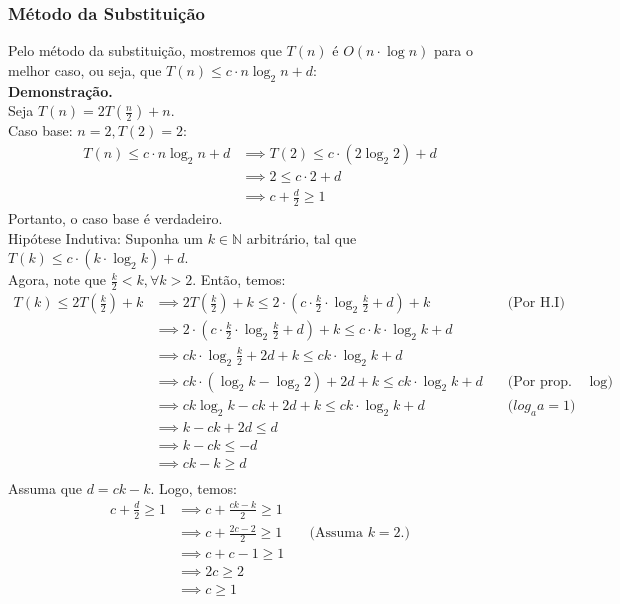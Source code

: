 \subsubsection{Método da Substituição}

Pelo método da substituição, mostremos que $T(n)$ é $O(n \cdot \log n)$ para o melhor caso, ou seja, que $T(n) \le c \cdot n \log_2 n + d$: \\
\textbf{Demonstração.} \\
Seja $T(n) = 2T(\frac{n}{2}) + n$. \\
Caso base: $n = 2, T(2) = 2$:
\begin{align*} 
  T(n) \le c \cdot n \log_2 n + d & \implies T(2) \le c \cdot (2 \log_2 2) + d \\ 
  &\implies 2 \le c \cdot 2 + d\\ 
  &\implies c + \frac{d}{2} \ge 1 
\end{align*}
Portanto, o caso base é verdadeiro. \\
Hipótese Indutiva: Suponha um $k \in \mathbb{N}$ arbitrário, tal que $T(k) \le c \cdot (k \cdot \log_2 k) + d$. \\
Agora, note que $\frac{k}{2} < k, \forall k > 2$. Então, temos:
\begin{align*}
  T(k) \le 2T(\frac{k}{2}) + k  & \implies 2T(\frac{k}{2}) + k \le 2 \cdot (c \cdot \frac{k}{2} \cdot \log_2 \frac{k}{2} + d) + k & \quad \text{(Por H.I)} \\
  & \implies 2 \cdot (c \cdot \frac{k}{2} \cdot \log_2 \frac{k}{2} + d) + k  \le c \cdot k \cdot \log_2 k + d \\
  & \implies ck \cdot \log_2 \frac{k}{2} + 2d + k \le ck \cdot \log_2 k + d \\
  & \implies ck \cdot (\log_2 k - \log_2 2) + 2d + k \le ck \cdot \log_2 k + d & \quad \text{(Por prop. de $\log$)} \\
  & \implies ck\log_2 k - ck  + 2d + k \le ck \cdot \log_2 k + d & \quad \text{($log_a a = 1$)} \\
  & \implies k - ck  + 2d \le d \\
  & \implies k - ck \le -d \\
  & \implies ck - k \ge d \\
\end{align*}
Assuma que $d = ck - k$. Logo, temos:
\begin{align*}
  c + \frac{d}{2} \ge 1 & \implies c + \frac{ck - k}{2} \ge 1 \\
  & \implies c + \frac{2c - 2}{2} \ge 1 & \quad \text{(Assuma $k = 2$.)} \\
  & \implies c + c - 1 \ge 1 \\
  & \implies 2c \ge 2 \\
  & \implies c \ge 1 \\
\end{align*}
